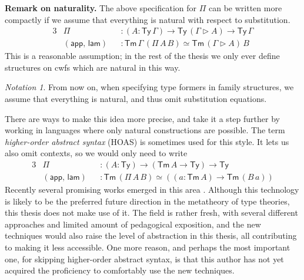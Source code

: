 \documentclass[12pt,a4paper,twoside,openany]{book}
\theoremstyle{remark}
\newtheorem{notation}{Notation}
\theoremstyle{definition}
\theoremstyle{theorem}
\newcommand{\ms}[1]{\mathsf{#1}}
\newcommand{\Tm}{\mathsf{Tm}}
\newcommand{\Ty}{\mathsf{Ty}}
\newcommand{\ext}{\triangleright}
\newcommand{\app}{\ms{app}}
\newcommand{\lam}{\ms{lam}}
\begin{document}
\textbf{Remark on naturality.} The above specification for $\Pi$ can be written
more compactly if we assume that everything is natural with respect to
substitution.
\begin{alignat*}{3}
  &\Pi            &&: (A : \Ty\,\Gamma) \to \Ty\,(\Gamma\ext A) \to \Ty\,\Gamma\\
  & (\app,\,\lam) &&: \Tm\,\Gamma\,(\Pi\,A\,B) \simeq \Tm\,(\Gamma \ext A)\,B
\end{alignat*}
This is a reasonable assumption; in the rest of the thesis we only ever define
structures on cwfs which are natural in this way.

\begin{notation} From now on, when specifying type formers in family structures,
we assume that everything is natural, and thus omit substitution equations.
\end{notation}

There are ways to make this idea more precise, and take it a step further by
working in languages where only natural constructions are possible. The term
\emph{higher-order abstract syntax} (HOAS) is sometimes used for this style. It lets us
also omit contexts, so we would only need to write
\begin{alignat*}{3}
  &\Pi            &&: (A : \Ty) \to (\Tm\,A \to \Ty) \to \Ty\\
  & (\app,\,\lam) &&: \Tm\,(\Pi\,A\,B) \simeq ((a : \Tm\,A) \to \Tm\,(B\,a))
\end{alignat*}
Recently several promising works emerged in this area \cite{TODO}. Although this
technology is likely to be the preferred future direction in the metatheory of
type theories, this thesis does not make use of it. The field is rather fresh,
with several different approaches and limited amount of pedagogical exposition,
and the new techniques would also raise the level of abstraction in this thesis,
all contributing to making it less accessible. One more reason, and perhaps the
most important one, for skipping higher-order abstract syntax, is that this
author has not yet acquired the proficiency to comfortably use the new
techniques.
\end{document}
